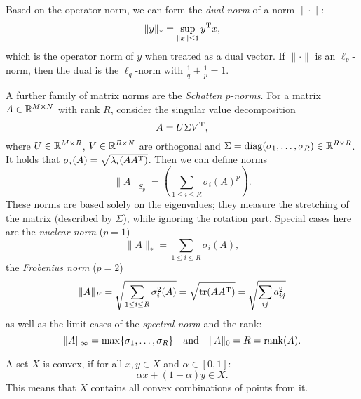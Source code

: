 \documentclass{article}
\begin{document}
Based on the operator norm, we can form the \emph{dual norm} of a norm \(\lVert \cdot \rVert\):
\begin{equation*}
  \lVert y \rVert_{*} = \sup_{\lVert x \rVert \leq 1} y^{\mathrm{T}} x,
\end{equation*}
which is the operator norm of \(y\) when treated as a dual vector.  If \(\lVert \cdot \rVert\) is an
\(\ell_p\)-norm, then the dual is the \(\ell_q\)-norm with \(\frac{1}{q} + \frac{1}{p} = 1\).

A further family of matrix norms are the \emph{Schatten \(p\)-norms}.  For a matrix \(A \in
\mathbb{R}^{M \times N}\) with rank \(R\), consider the singular value decomposition
\begin{equation*}
  A = U \Sigma V^{\mathrm{T}},
\end{equation*}
where \(U \in \mathbb{R}^{M \times R}\), \(V \in \mathbb{R}^{R \times N}\) are orthogonal and
\(\Sigma = \operatorname{diag}(\sigma_1, \ldots, \sigma_R) \in \mathbb{R}^{R \times R}\).  It holds that
\(\sigma_i(A) = \sqrt{\lambda_i(A A^{\mathrm{T}})}\).  Then we can define norms
\begin{equation*}
  \lVert A \rVert_{S_p} = \left( \sum_{1 \leq i \leq R} \sigma_i(A)^p \right).
\end{equation*}
These norms are based solely on the eigenvalues; they measure the stretching of the matrix
(described by \(\Sigma\)), while ignoring the rotation part.  Special cases here are the
\emph{nuclear norm} (\(p = 1\))
\begin{equation*}
  \lVert A \rVert_{*} = \sum_{1 \leq i \leq R} \sigma_i(A),
\end{equation*}
the \emph{Frobenius norm} (\(p = 2\))
\begin{equation*}
  \lVert A \rVert_{F} = \sqrt{\sum_{1 \leq i \leq R} \sigma_i^2(A)}
    = \sqrt{\operatorname{tr}(AA^{\mathrm{T}})} = \sqrt{\sum_{ij} a_{ij}^2}
\end{equation*}
as well as the limit cases of the \emph{spectral norm} and the rank:
\begin{equation*}
  \lVert A \rVert_{\infty} = \max\{\sigma_1, \ldots, \sigma_R\} \quad \text{and} \quad
  \lVert A \rVert_{0} = R = \operatorname{rank}(A).
\end{equation*}

\label{s:convex_sets}

A set \(X\) is convex, if for all \(x, y \in X\) and \(\alpha \in [0,1]\):
\begin{equation*}
  \alpha x + (1 - \alpha) y \in X.
\end{equation*}
This means that \(X\) contains all convex combinations of points from it.
\end{document}
